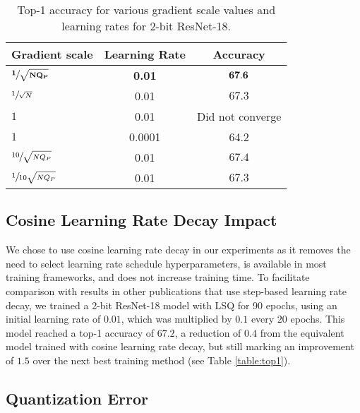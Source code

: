 \documentclass{article}
\begin{document}
\begin{table}[h]
	\caption{Top-1 accuracy for various gradient scale values and learning rates for 2-bit ResNet-18.}
	\label{table:gscale}
	\setlength\tabcolsep{6pt}
\begin{center}
	\begin{small}
\begin{tabular}{l c c}
    		\toprule
		Gradient scale 		& Learning Rate 	& Accuracy \\
		\midrule
		$\bf{\sfrac{1}{\sqrt{NQ_P}}}$	& \bf{0.01}		& $\bf{67.6}$	\\ 
		\midrule		
		$\sfrac{1}{\sqrt{N}}$		& 0.01		& $67.3$		\\
		$ 1 $				& 0.01		&  Did not converge \\
		$ 1 $				& 0.0001		&  64.2 \\
		\midrule		 	
		$\sfrac{10}{\sqrt{NQ_P}}$		& 0.01		& $67.4$		\\ 	
		$\sfrac{1}{10\sqrt{NQ_P}}$ 	& 0.01		& $67.3$		\\
		\bottomrule
	\end{tabular}
\end{small}
	\end{center}
\end{table}


\subsection{Cosine Learning Rate Decay Impact}

We chose to use cosine learning rate decay in our experiments as it removes the need to select learning rate schedule hyperparameters, is available in most training frameworks, and does not increase training time.
To facilitate comparison with results in other publications that use step-based learning rate decay, we trained a 2-bit ResNet-18 model with LSQ for 90 epochs, using an initial learning rate of $0.01$, which was multiplied by $0.1$ every $20$ epochs.
This model reached a top-1 accuracy of $67.2$, a reduction of $0.4$ from the equivalent model trained with cosine learning rate decay, but still marking an improvement of $1.5$ over the next best training method (see Table \ref{table:top1}).



\subsection{Quantization Error}
\label{sec:qe}
\end{document}
